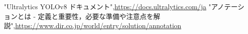 

\renewcommand{\bibname}{参考文献}
\begin{thebibliography}{99}
"Ultralytics YOLOv8 ドキュメント",\url{https://docs.ultralytics.com/ja}
"アノテーションとは - 定義と重要性，必要な準備や注意点を解説",\url{https://www.dir.co.jp/world/entry/solution/annotation}
 \end{thebibliography}
 
